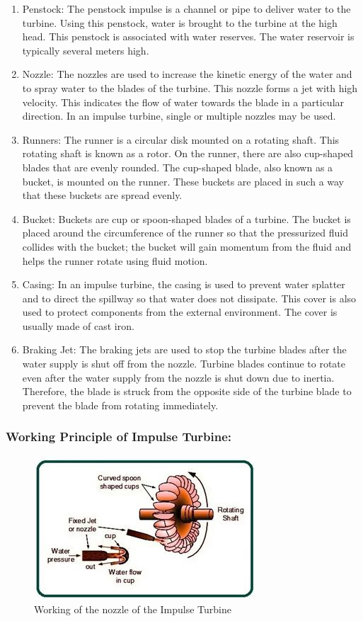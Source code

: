 \documentclass[11pt]{article}
\begin{document}
\begin{enumerate}
	\item Penstock: The penstock impulse is a channel or pipe to deliver water to the turbine. Using this penstock, water is brought to the turbine at the high head. This penstock is associated with water reserves. The water reservoir is typically several meters high.
	\item Nozzle: The nozzles are used to increase the kinetic energy of the water and to spray water to the blades of the turbine. This nozzle forms a jet with high velocity. This indicates the flow of water towards the blade in a particular direction. In an impulse turbine, single or multiple nozzles may be used.
	\item Runners: The runner is a circular disk mounted on a rotating shaft. This rotating shaft is known as a rotor. On the runner, there are also cup-shaped blades that are evenly rounded. The cup-shaped blade, also known as a bucket, is mounted on the runner. These buckets are placed in such a way that these buckets are spread evenly.
	\item Bucket: Buckets are cup or spoon-shaped blades of a turbine. The bucket is placed around the circumference of the runner so that the pressurized fluid collides with the bucket; the bucket will gain momentum from the fluid and helps the runner rotate using fluid motion.
	\item Casing: In an impulse turbine, the casing is used to prevent water splatter and to direct the spillway so that water does not dissipate. This cover is also used to protect components from the external environment. The cover is usually made of cast iron.
	\item Braking Jet: The braking jets are used to stop the turbine blades after the water supply is shut off from the nozzle. Turbine blades continue to rotate even after the water supply from the nozzle is shut down due to inertia. Therefore, the blade is struck from the opposite side of the turbine blade to prevent the blade from rotating immediately.
\end{enumerate}

\subsubsection{Working Principle of Impulse Turbine:}


\begin{figure}[H]
	\centering
	\includegraphics[scale=1]{impulse turbine 2.jpg}
	\caption{Working of the nozzle of the Impulse Turbine}
	\label{it2}
\end{figure}
\end{document}
